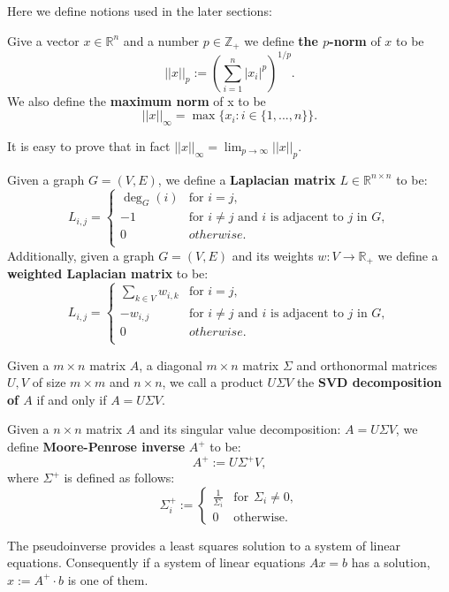Here we define notions used in the later sections:
\begin{definition}
Give a vector $x\in\mathbb{R}^n$ and a number $p\in \mathbb{Z}_+$ we define \textbf{the $p$-norm} of $x$ to be
\[
||x||_p := \left(\sum_{i=1}^n|x_i|^p\right)^{1/p}.
\]
We also define the \textbf{maximum norm} of x to be
\[
||x||_\infty = \max\{x_i\colon i\in\{1,...,n\}\}.
\]
\end{definition}
It is easy to prove that in fact $||x||_\infty = \lim_{p\rightarrow\infty}||x||_p$.


\begin{definition}\label{laplacian}
Given a graph $G=(V,E)$, we define a \textbf{Laplacian matrix} $L\in \mathbb{R}^{n\times n} $ to be:
\[
L_{i,j} =
\begin{cases}
\deg_G(i) & \text{for } i = j, \\
-1 & \text{for } i \not= j \text{ and }i\text{ is adjacent to }j\text{ in }G, \\
0 & otherwise.  \\
\end{cases}
\]
Additionally, given a graph $G=(V,E)$ and its weights $w:V\rightarrow\mathbb{R}_+$ we define a \textbf{weighted Laplacian matrix} to be:
\[
L_{i, j} =
\begin{cases}
\sum_{k \in V}w_{i,k} & \text{for } i = j, \\
-w_{i,j} & \text{for } i \not= j \text{ and }i\text{ is adjacent to }j\text{ in }G, \\
0 & otherwise.  \\
\end{cases}
\]

\begin{definition}
Given a $m \times n$ matrix $A$, a diagonal $m \times n$ matrix $\Sigma$ and orthonormal matrices $U, V$ of size $m \times m$ and $n \times n$, we call a product $U\Sigma V$ the \textbf{SVD decomposition of $A$} if and only if
$A = U\Sigma V$.
\end{definition}

\begin{definition}\label{moore_def}
Given a $n \times n$ matrix $A$ and its singular value decomposition: $A=U\Sigma V$, we define \textbf{Moore-Penrose inverse} $A^+$ to be:
\[
A^+ := U\Sigma^+ V,
\]
where $\Sigma^+$ is defined as follows:
\[
\Sigma^+_i := \begin{cases}
    \frac{1}{\Sigma_i} & \text{for} \hspace{5pt} \Sigma_i\not=0, \\
    0 & \text{otherwise}.
  \end{cases}
\]
\end{definition}
\begin{lemma}\label{moore_lemma}
The pseudoinverse provides a least squares solution to a system of linear equations. Consequently if a system of linear equations $Ax=b$ has a solution, $x:=A^+\cdot b$ is one of them.
\end{lemma}
\end{definition}
